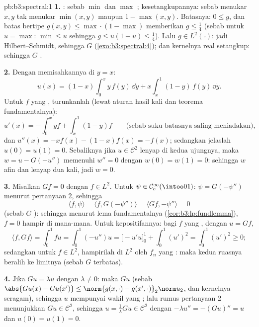 \begin{solution}{pb:b3:spectral:1}
\textbf{1.} : sebab $\min$ dan $\max$ ;
kesetangkupannya: sebab menukar $x, y$ tak menukar $\min(x,y)$ maupun $1 -
\max(x,y)$. Batasnya: $0 \leq g$, dan batas bertipe
$g(x,y) \leq \max\cdot(1-\max)$ memberikan $g \leq \frac14$ (sebab untuk $u
= \max$: $\min \leq u$ sehingga $g \leq u(1-u) \leq \frac14$). Lalu $g
\in L^2(\square)$: jadi Hilbert--Schmidt, sehingga $G$ 
(\cref{exo:b3:spectral:4}); dan kernelnya real setangkup: sehingga $G$
.

\textbf{2.} Dengan memisahkannya di $y = x$:
\[
u(x) = (1 - x)\int_0^x y\,f(y)\,\dd y +
x\int_x^1(1 - y)\,f(y)\,\dd y .
\]
Untuk $f$ yang , turunkanlah (lewat aturan hasil kali dan teorema
fundamentalnya):
\[
u'(x) = -\int_0^xyf + \int_x^1(1-y)f
\qquad\text{(sebab suku batasnya saling meniadakan)},
\]
dan $u''(x) = -xf(x) - (1 - x)f(x) = -f(x)$; sedangkan jelaslah $u(0) =
u(1) = 0$. Sebaliknya jika $u \in \mathcal C^2$ lenyap di kedua
ujungnya, maka $w = u - G(-u'')$ memenuhi $w'' = 0$ dengan $w(0) = w(1) =
0$: sehingga $w$ afin dan lenyap dua kali, jadi $w = 0$.

\textbf{3.} Misalkan $Gf = 0$ dengan $f \in L^2$. Untuk $\psi \in \mathcal
C_c^\infty(\intoo01)$: $\psi = G(-\psi'')$ menurut pertanyaan 2, sehingga
\[
\langle f, \psi\rangle = \langle f, G(-\psi'')\rangle
= \langle Gf, -\psi''\rangle = 0
\]
(sebab $G$ ): sehingga menurut lema fundamentalnya
(\cref{cor:b3:lp:fundlemma}), $f = 0$ hampir di mana-mana. Untuk kepositifannya: bagi
$f$ yang , dengan $u = Gf$,
\[
\langle f, Gf\rangle = \int_0^1 fu = \int_0^1(-u'')u
= \bigl[-u'u\bigr]_0^1 + \int_0^1(u')^2 = \int_0^1(u')^2
\geq 0 ;
\]
sedangkan untuk $f \in L^2$, hampirilah di $L^2$ oleh $f_n$ yang :
maka kedua ruasnya beralih ke limitnya (sebab $G$ terbatas).

\textbf{4.} Jika $Gu = \lambda u$ dengan $\lambda \neq 0$: maka $Gu$
 (sebab $\abs{Gu(x) - Gu(x')} \leq \norm{g(x,\cdot) -
g(x',\cdot)}_2\norm u_2$, dan kernelnya  seragam),
sehingga $u$ mempunyai wakil yang ; lalu
rumus pertanyaan 2 menunjukkan $Gu \in \mathcal C^2$, sehingga $u =
\frac1\lambda Gu \in \mathcal C^2$ dengan $-\lambda u'' =
-(Gu)'' = u$ dan $u(0) = u(1) = 0$.


\end{solution}
